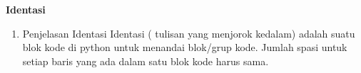 \begin{enumerate}
    \textbf{Identasi}
        \begin{enumerate}
        
        \item  Penjelasan Identasi 
         Identasi ( tulisan yang menjorok kedalam) adalah suatu blok kode di python untuk menandai blok/grup kode.  Jumlah spasi untuk setiap baris yang ada dalam satu blok kode harus sama. 
        
       \end{enumerate}
        
\end{enumerate}
        